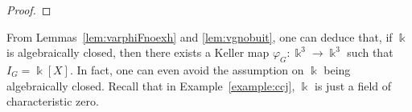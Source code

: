 \documentclass[11pt,reqno]{amsart}
\theoremstyle{definition}
\newcommand{\mbk}{\mbox{$\Bbbk$}}
\begin{document}
\begin{proof}

\end{proof}

From Lemmas~\ref{lem:varphiFnoexh} and \ref{lem:vgnobuit}, one can deduce 
that, if $\mbk$ is algebraically closed, then 
there exists a Keller map $\varphi_G:\mbk^3\to\mbk^3$
such that $I_G=\mbk[X]$. In fact, one can even avoid the assumption on
$\mbk$ being algebraically closed. Recall that in Example~\ref{example:ccj}, $\mbk$ is just 
a field of characteristic zero. 
\end{document}
